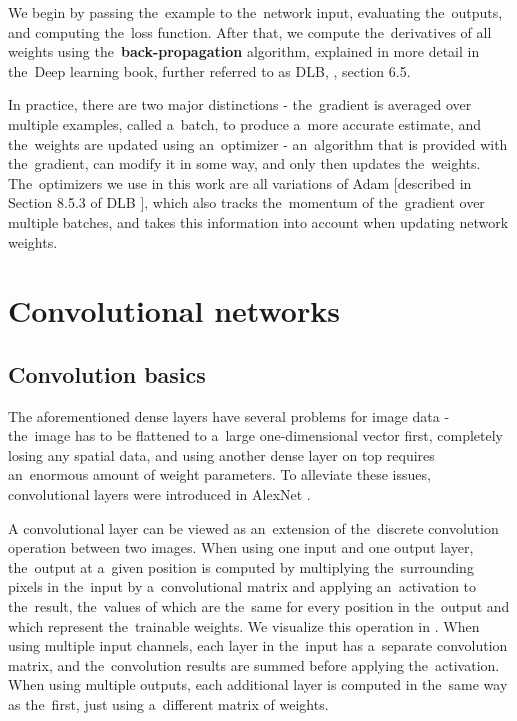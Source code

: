 We begin by passing the~example to the~network input, evaluating the~outputs, and computing the~loss function. After that, we compute the~derivatives of all weights using the~\textbf{back-propagation} algorithm, explained in more detail in the~Deep learning book, further referred to as DLB, \citep{deep_learning_book}, section 6.5.

In practice, there are two major distinctions - the~gradient is averaged over multiple examples, called a~batch, to produce a~more accurate estimate, and the~weights are updated using an~optimizer - an~algorithm that is provided with the~gradient, can modify it in some way, and only then updates the~weights. The~optimizers we use in this work are all variations of Adam [described in Section 8.5.3 of DLB \citep{deep_learning_book}], which also tracks the~momentum of the~gradient over multiple batches, and takes this information into account when updating network weights.


\section{Convolutional networks}

\subsection{Convolution basics}

The aforementioned dense layers have several problems for image data - the~image has to be flattened to a~large one-dimensional vector first, completely losing any spatial data, and using another dense layer on top requires an~enormous amount of weight parameters. To alleviate these issues, convolutional layers were introduced in AlexNet \citep{alex_net}.

A convolutional layer can be viewed as an~extension of the~discrete convolution operation between two images. When using one input and one output layer, the~output at a~given position is computed by multiplying the~surrounding pixels in the~input by a~convolutional matrix and applying an~activation to the~result, the~values of which are the~same for every position in the~output and which represent the~trainable weights. We visualize this operation in . When using multiple input channels, each layer in the~input has a~separate convolution matrix, and the~convolution results are summed before applying the~activation. When using multiple outputs, each additional layer is computed in the~same way as the~first, just using a~different matrix of weights.


